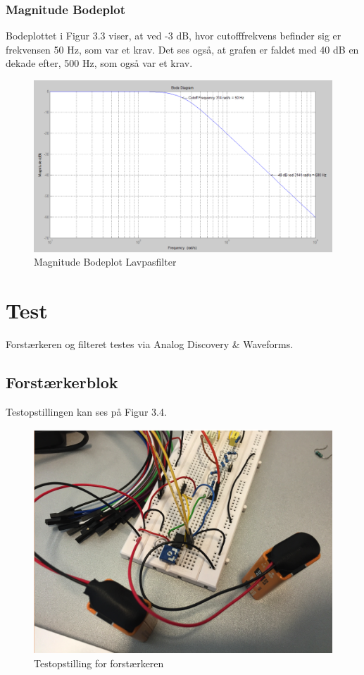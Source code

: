 \subsubsection{Magnitude Bodeplot}
Bodeplottet i Figur 3.3 viser, at ved -3 dB, hvor cutofffrekvens befinder sig er frekvensen 50 Hz, som var et krav. Det ses også, at grafen er faldet med 40 dB en dekade efter, 500 Hz, som også var et krav.   
\begin{figure}[H]
	\centering
	\includegraphics[width=1\textwidth]{Figurer/Bodeplot_Lavpasfilter_Teoretisk}
	\caption{Magnitude Bodeplot Lavpasfilter}
	\label{fig:Bodeplot}
\end{figure}

\section{Test}
Forstærkeren og filteret testes via Analog Discovery \& Waveforms.

\subsection{Forstærkerblok}
Testopstillingen kan ses på Figur 3.4. 

\begin{figure}[H]
	\centering
	\includegraphics[width=1\textwidth]{Figurer/Snip20151117_106}
	\caption{Testopstilling for forstærkeren}
\end{figure}

